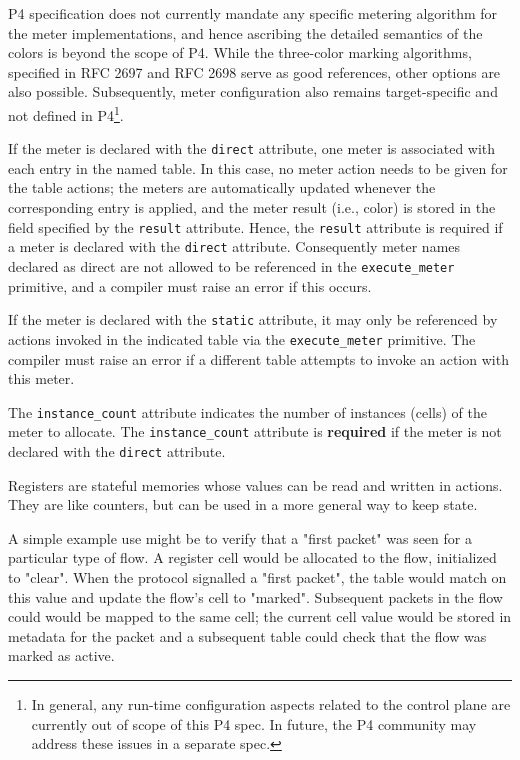 \documentclass[12pt]{article}
\begin{document}
P4 specification does not currently mandate any specific metering 
algorithm for the meter implementations, and hence ascribing the 
detailed semantics of the colors is beyond the scope of P4. While 
the three-color marking algorithms, specified in RFC 2697 and RFC 2698 
serve as good references, other options are also possible. Subsequently, 
meter configuration also remains target-specific and not defined 
in P4\footnote{In general, any run-time configuration aspects related 
to the control plane are currently out of scope of this P4 spec. In future, 
the P4 community may address these issues in a separate spec.}.

If the meter is declared with the \texttt{direct} attribute, one meter
is associated with each entry in the named table. In this case, no 
meter action needs to be given for the table actions; the meters are 
automatically updated whenever the corresponding entry is applied,
and the meter result (i.e., color) is stored in the field specified 
by the \texttt{result} attribute. Hence, the \texttt{result} attribute
is required if a meter is declared with the \texttt{direct} attribute.
Consequently meter names declared as direct are not allowed to be 
referenced in the \texttt{execute_meter} primitive, and a compiler must
raise an error if this occurs. 

If the meter is declared with the \texttt{static} attribute, it may only
be referenced by actions invoked in the indicated table via the \texttt{execute_meter}
primitive. The compiler must raise an error if a different table 
attempts to invoke an action with this meter.

The \texttt{instance_count} attribute indicates the number of
instances (cells) of the meter to allocate.  The
\texttt{instance_count} attribute is \textbf{required} if the meter
is not declared with the \texttt{direct} attribute.


Registers are stateful memories whose values can be read and written
in actions.  They are like counters, but can be used in a more general
way to keep state.

A simple example use might be to verify that a "first packet" was seen
for a particular type of flow. A register cell would be allocated to
the flow, initialized to "clear". When the protocol signalled a "first
packet", the table would match on this value and update the flow's
cell to "marked".  Subsequent packets in the flow could would be
mapped to the same cell; the current cell value would be stored in
metadata for the packet and a subsequent table could check that the
flow was marked as active.
\end{document}
